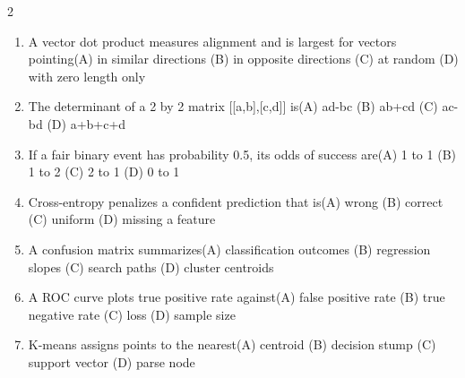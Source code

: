 \documentclass[a4paper]{article}
\begin{document}
\begin{multicols*}{2}
\begin{enumerate}[resume]
\item A vector dot product measures alignment and is largest for vectors pointing\newline\hspace*{0.6em}(A) in similar directions \quad (B) in opposite directions \newline\hspace*{0.6em}(C) at random \quad (D) with zero length only
\item The determinant of a 2 by 2 matrix [[a,b],[c,d]] is\newline\hspace*{0.6em}(A) ad-bc \quad (B) ab+cd \newline\hspace*{0.6em}(C) ac-bd \quad (D) a+b+c+d
\item If a fair binary event has probability 0.5, its odds of success are\newline\hspace*{0.6em}(A) 1 to 1 \quad (B) 1 to 2 \newline\hspace*{0.6em}(C) 2 to 1 \quad (D) 0 to 1
\item Cross-entropy penalizes a confident prediction that is\newline\hspace*{0.6em}(A) wrong \quad (B) correct \newline\hspace*{0.6em}(C) uniform \quad (D) missing a feature
\item A confusion matrix summarizes\newline\hspace*{0.6em}(A) classification outcomes \quad (B) regression slopes \newline\hspace*{0.6em}(C) search paths \quad (D) cluster centroids
\item A ROC curve plots true positive rate against\newline\hspace*{0.6em}(A) false positive rate \quad (B) true negative rate \newline\hspace*{0.6em}(C) loss \quad (D) sample size
\item K-means assigns points to the nearest\newline\hspace*{0.6em}(A) centroid \quad (B) decision stump \newline\hspace*{0.6em}(C) support vector \quad (D) parse node

\end{enumerate}
\end{multicols*}
\end{document}
